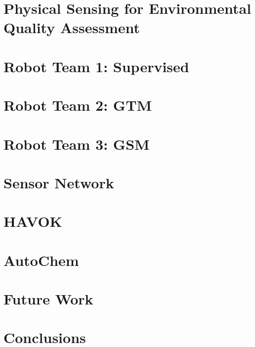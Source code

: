 \documentclass{article}
\begin{document}
\section{Physical Sensing for Environmental Quality Assessment}

\section{Robot Team 1: Supervised}

\section{Robot Team 2: GTM}

\section{Robot Team 3: GSM}

\section{Sensor Network}

\section{HAVOK}

\section{AutoChem}

\section{Future Work}

\section{Conclusions}
\end{document}

